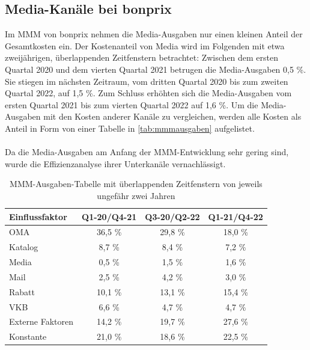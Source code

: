 \subsection{Media-Kanäle bei bonprix} 
Im \ac{MMM} von bonprix nehmen die Media-Ausgaben nur einen kleinen Anteil der Gesamtkosten ein. Der Kostenanteil von Media wird im Folgenden mit etwa zweijährigen, überlappenden Zeitfenstern betrachtet: Zwischen dem ersten Quartal 2020 und dem vierten Quartal 2021 betrugen die Media-Ausgaben 0,5 \%. Sie stiegen im nächsten Zeitraum, vom dritten Quartal 2020 bis zum zweiten Quartal 2022, auf 1,5 \%. Zum Schluss erhöhten sich die Media-Ausgaben vom ersten Quartal 2021 bis zum vierten Quartal 2022 auf 1,6 \%. Um die Media-Ausgaben mit den Kosten anderer Kanäle zu vergleichen, werden alle Kosten als Anteil in Form von einer Tabelle in \autoref{tab:mmmausgaben} aufgelistet. \\\\
Da die Media-Ausgaben am Anfang der \ac{MMM}-Entwicklung sehr gering sind, wurde die Effizienzanalyse ihrer Unterkanäle vernachlässigt.  
\begin{table}[h!]
\centering
\renewcommand{\arraystretch}{1.3}
\setlength{\tabcolsep}{10pt}
\begin{tabular}{|l|c|c|c|}
\hline
\textbf{Einflussfaktor} & \textbf{Q1-20/Q4-21} & \textbf{Q3-20/Q2-22} & \textbf{Q1-21/Q4-22} \\ \hline
OMA                    & 36,5 \%               & 29,8 \%               & 18,0 \%               \\ \hline
Katalog                & 8,7 \%                & 8,4 \%                & 7,2 \%                \\ \hline
Media                  & 0,5 \%                & 1,5 \%                & 1,6 \%                \\ \hline
Mail                   & 2,5 \%                & 4,2 \%                & 3,0 \%                \\ \hline
Rabatt                 & 10,1 \%               & 13,1 \%               & 15,4 \%               \\ \hline
VKB                    & 6,6 \%                & 4,7 \%                & 4,7 \%                \\ \hline
Externe Faktoren       & 14,2 \%               & 19,7 \%               & 27,6 \%               \\ \hline
Konstante              & 21,0 \%               & 18,6 \%               & 22,5 \%               \\ \hline
\end{tabular}
\caption{\ac{MMM}-Ausgaben-Tabelle mit überlappenden Zeitfenstern von jeweils ungefähr zwei Jahren}
\label{tab:mmmausgaben}
\end{table}

